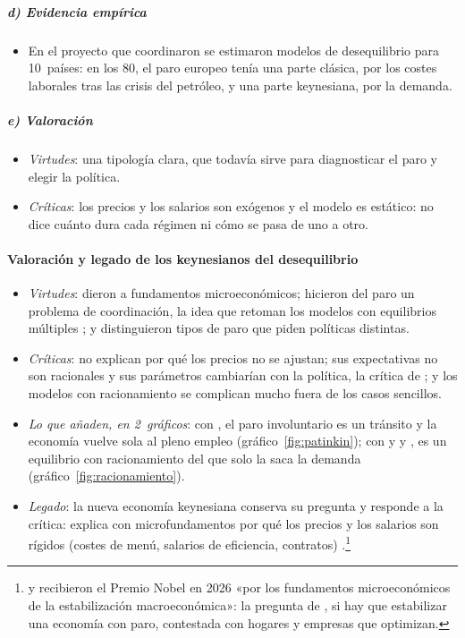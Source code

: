 \documentclass[11pt]{article}
\begin{document}
\subparagraph{d) Evidencia empírica}

\begin{itemize}
\item En el proyecto que coordinaron \textcite{DrezeBean1990Europe} se estimaron modelos de desequilibrio para 10~países: en los 80, el paro europeo tenía una parte clásica, por los costes laborales tras las crisis del petróleo, y una parte keynesiana, por la demanda.
\end{itemize}

\subparagraph{e) Valoración}

\begin{itemize}
\item \emph{Virtudes}: una tipología clara, que todavía sirve para diagnosticar el paro y elegir la política.
\item \emph{Críticas}: los precios y los salarios son exógenos y el modelo es estático: no dice cuánto dura cada régimen ni cómo se pasa de uno a otro.
\end{itemize}

\paragraph{Valoración y legado de los keynesianos del desequilibrio}

\begin{itemize}
\item \emph{Virtudes}: dieron a  fundamentos microeconómicos; hicieron del paro un problema de coordinación, la idea que retoman los modelos con equilibrios múltiples\nocite{CooperJohn1988Coordinating} ; y distinguieron tipos de paro que piden políticas distintas.
\item \emph{Críticas}: no explican por qué los precios no se ajustan\nocite{Barro1979Second}; sus expectativas no son racionales y sus parámetros cambiarían con la política, la crítica de  ; y los modelos con racionamiento se complican mucho fuera de los casos sencillos.
\item \emph{Lo que añaden, en 2~gráficos}: con , el paro involuntario es un tránsito y la economía vuelve sola al pleno empleo (gráfico~\ref{fig:patinkin}); con  y  y , es un equilibrio con racionamiento del que solo la saca la demanda (gráfico~\ref{fig:racionamiento}).
\item \emph{Legado}: la nueva economía keynesiana conserva su pregunta y responde a la crítica: explica con microfundamentos por qué los precios y los salarios son rígidos (costes de menú, salarios de eficiencia, contratos) .\footnote{ y  recibieron el Premio Nobel en 2026 «por los fundamentos microeconómicos de la estabilización macroeconómica»\nocite{Nobel2026Prensa}: la pregunta de , si hay que estabilizar una economía con paro, contestada con hogares y empresas que optimizan.}
\end{itemize}
\end{document}

